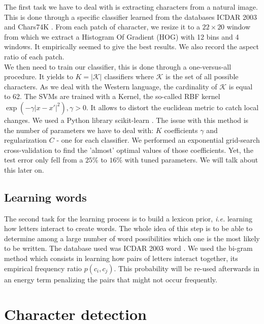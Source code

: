 \documentclass[10pt,a4paper]{article}
\begin{document}
The first task we have to deal with is extracting characters from a natural image. This is done through a specific classifier learned from the databases ICDAR 2003 \cite{ICDARchar} and Chars74K \cite{Char74K}. From each patch of character, we resize it to a $22\times 20$ window from which we extract a Histogram Of Gradient (HOG) \cite{Dal2005} with 12 bins and 4 windows. It empirically seemed to give the best results. We also record the aspect ratio of each patch. \\

We then need to train our classifier, this is done through a one-versus-all procedure. It yields to $K = |\mathcal{K}|$ classifiers where $\mathcal{K}$ is the set of all possible characters. As we deal with the Western language, the cardinality of $\mathcal{K}$ is equal to 62. The SVMs are trained with a Kernel, the so-called RBF kernel $\exp(-\gamma |x-x'|^2), \gamma > 0$. It allows to distort the euclidean metric to catch local changes. We used a Python library scikit-learn \cite{scikit}. The issue with this method is the number of parameters we have to deal with: $K$ coefficients $\gamma$ and regularization $C$ - one for each classifier. We performed an exponential grid-search cross-validation to find the 'almost' optimal values of those coefficients. Yet, the test error only fell from a $25\%$ to $16\%$ with tuned parameters. We will talk about this later on. 


\subsection{Learning words}

The second task for the learning process is to build a lexicon prior, \emph{i.e.} learning how letters interact to create words. The whole idea of this step is to be able to determine among a large number of word possibilities which one is the most likely to be written. The database used was ICDAR 2003 word \cite{ICDARword}. We used the bi-gram method which consists in learning how pairs of letters interact together, its empirical frequency ratio $p(c_i,c_j)$. This probability will be re-used afterwards in an energy term penalizing the pairs that might not occur frequently. 




\section{Character detection}
\end{document}

